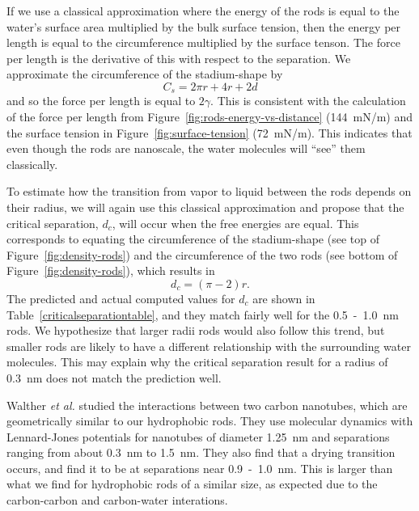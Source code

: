 \documentclass[letterpaper,twocolumn,amsmath,amssymb,prb]{revtex4-1}
\begin{document}
If we use a classical approximation where the energy of the rods is equal to 
the water's surface area multiplied by the bulk surface tension, then the energy per 
length is equal to the circumference multiplied by the surface tenson. The force
per length is the derivative of this with respect to the separation. We approximate 
the circumference of the stadium-shape by
\begin{equation}
C_{s} = 2\pi r +4r+2d
\end{equation}
and so the force per length is equal to $2\gamma$. This 
is consistent with the calculation of the force per length from 
Figure~\ref{fig:rods-energy-vs-distance} (144~mN/m) and the surface tension 
in Figure~\ref{fig:surface-tension} (72~mN/m). This indicates that
even though the rods are nanoscale, the water molecules will ``see'' them classically.

To estimate how the transition from vapor to liquid between the rods depends on their 
radius, we will again use this classical approximation and propose that 
the critical separation, $d_c$, will occur when the free energies are equal. This 
corresponds to equating the circumference of the stadium-shape (see 
top of Figure~\ref{fig:density-rods}) and the circumference of the two rods (see bottom
of Figure~\ref{fig:density-rods}), which results in
\begin{equation}
d_c = (\pi-2)r.\label{criticalseparation}
\end{equation}
The predicted and actual computed values for $d_c$ are shown in 
Table~\ref{criticalseparationtable}, and they match fairly well for the 
0.5~-~1.0~nm rods. We hypothesize that larger radii rods
would also follow this trend, but smaller rods are likely to have a different
relationship with the surrounding water molecules. This may explain why the critical
separation result for a radius of 0.3~nm does not match the prediction well.

Walther \emph{et al.}\cite{walther2004hydrodynamic} studied the interactions between two
carbon nanotubes, which are geometrically similar to our hydrophobic rods. 
They use molecular dynamics with Lennard-Jones potentials for
nanotubes of diameter 1.25~nm and separations ranging from about 0.3~nm to 1.5~nm.
They also find that a drying transition occurs, and find it to be at separations near
0.9~-~1.0~nm\cite{walther2004hydrodynamic}. This is larger than
what we find for hydrophobic rods of a similar size, as expected due to the carbon-carbon
and carbon-water interations. 
\end{document}
